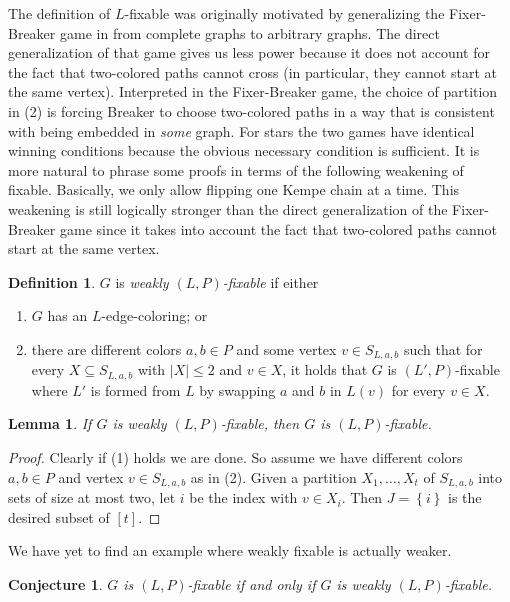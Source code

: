 \documentclass[12pt]{article}
\theoremstyle{plain}
\newtheorem{lem}[thm]{Lemma}
\newtheorem{conjecture}[thm]{Conjecture}
\theoremstyle{definition}
\newtheorem{defn}{Definition}
\theoremstyle{remark}
\newcommand{\set}[1]{\left\{ #1 \right\}}
\newcommand{\irange}[1]{\left[#1\right]}
\begin{document}
The definition of $L$-fixable was originally motivated by generalizing 
the Fixer-Breaker game in \cite{HallGame} from complete graphs to arbitrary graphs.  
The direct generalization of that game gives us less power because it does not
account for the fact that two-colored paths cannot cross (in particular, they cannot start at the same vertex).  Interpreted in the
Fixer-Breaker game, the choice of partition in (2) is forcing Breaker to choose
two-colored paths in a way that is consistent with being embedded in
\emph{some} graph.  For stars the two games have identical winning conditions
because the obvious necessary condition is sufficient.  It is more natural to phrase
some proofs in terms of the following weakening of fixable.  
Basically, we only allow flipping one Kempe chain at a time.  
This weakening is still logically stronger than the direct generalization 
of the Fixer-Breaker game since it takes into account the fact that two-colored paths cannot start at the same vertex.

\begin{defn}
$G$ is \emph{weakly $(L, P)$-fixable} if either
\begin{enumerate}
\item[(1)] $G$ has an $L$-edge-coloring; or
\item[(2)] there are different colors $a,b \in P$ and some vertex $v \in S_{L,a,b}$ such
that for every $X \subseteq S_{L,a,b}$ with $|X| \le 2$ and $v \in X$, it holds
that $G$ is $(L', P)$-fixable where $L'$ is formed from $L$ by swapping $a$ and
$b$ in $L(v)$ for every $v \in X$.
\end{enumerate}
\end{defn}

\begin{lem}\label{weaklyfixable}
If $G$ is weakly $(L, P)$-fixable, then $G$ is $(L, P)$-fixable.
\end{lem}
\begin{proof}
Clearly if (1) holds we are done.  So assume we have different colors $a,b \in P$ and
vertex $v \in S_{L,a,b}$ as in (2). Given a partition $X_1, \ldots, X_t$ of
$S_{L,a,b}$ into sets of size at most two, let $i$ be the index with $v \in
X_i$.  Then $J = \set{i}$ is the desired subset of $\irange{t}$.
\end{proof}

We have yet to find an example where weakly fixable is actually weaker.

\begin{conjecture}
	$G$ is $(L, P)$-fixable if and only if $G$ is weakly $(L, P)$-fixable.
\end{conjecture}
\end{document}
